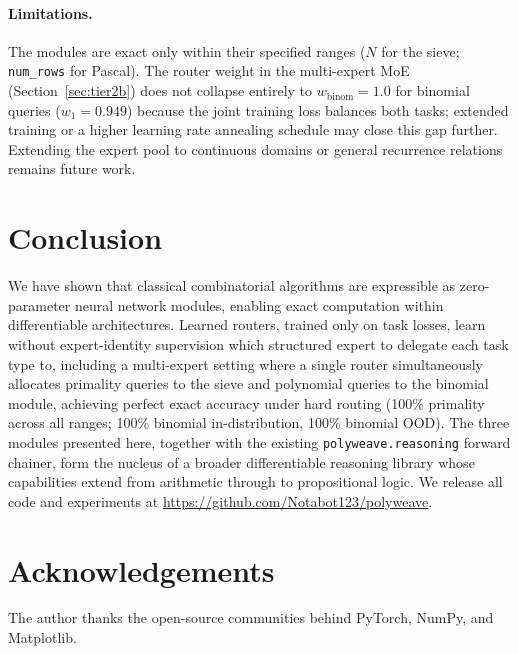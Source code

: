 \documentclass{article}
\begin{document}
\paragraph{Limitations.}
The modules are exact only within their specified ranges ($N$ for the sieve;
\texttt{num\_rows} for Pascal). The router weight in the multi-expert MoE
(Section~\ref{sec:tier2b}) does not collapse entirely to $w_\text{binom} = 1.0$
for binomial queries ($w_1 = 0.949$) because the joint training loss balances both
tasks; extended training or a higher learning rate annealing schedule may close this
gap further. Extending the expert pool to continuous domains or general recurrence
relations remains future work.

\section{Conclusion}
\label{sec:conclusion}

We have shown that classical combinatorial algorithms are expressible as zero-parameter
neural network modules, enabling exact computation within differentiable architectures.
Learned routers, trained only on task losses, learn without expert-identity supervision
which structured expert to delegate each task type to, including a multi-expert setting
where a single router simultaneously allocates primality queries to the sieve and
polynomial queries to the binomial module, achieving perfect exact accuracy under
hard routing (100\% primality across all ranges; 100\% binomial in-distribution,
100\% binomial OOD).
The three modules presented here, together with the existing \texttt{polyweave.reasoning}
forward chainer, form the nucleus of a broader differentiable reasoning library
whose capabilities extend from arithmetic through to propositional logic.
We release all code and experiments at \url{https://github.com/Notabot123/polyweave}.

\section*{Acknowledgements}

The author thanks the open-source communities behind PyTorch, NumPy, and Matplotlib.



\end{document}
